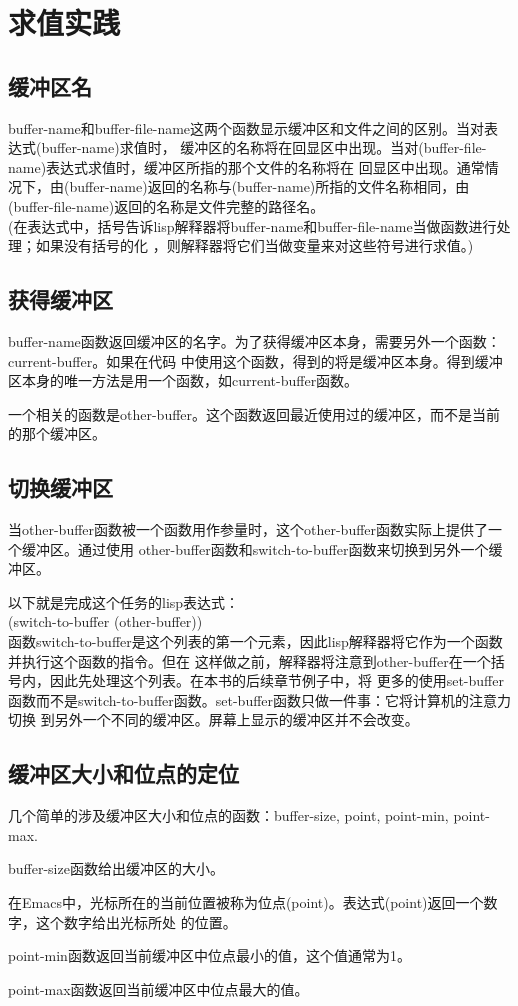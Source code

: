 \chapter{求值实践}
\section{缓冲区名}
buffer-name和buffer-file-name这两个函数显示缓冲区和文件之间的区别。当对表达式(buffer-name)求值时，
缓冲区的名称将在回显区中出现。当对(buffer-file-name)表达式求值时，缓冲区所指的那个文件的名称将在
回显区中出现。通常情况下，由(buffer-name)返回的名称与(buffer-name)所指的文件名称相同，由
(buffer-file-name)返回的名称是文件完整的路径名。\\
(在表达式中，括号告诉lisp解释器将buffer-name和buffer-file-name当做函数进行处理；如果没有括号的化
，则解释器将它们当做变量来对这些符号进行求值。)

\section{获得缓冲区}
buffer-name函数返回缓冲区的名字。为了获得缓冲区本身，需要另外一个函数：current-buffer。如果在代码
中使用这个函数，得到的将是缓冲区本身。得到缓冲区本身的唯一方法是用一个函数，如current-buffer函数。
\par{一个相关的函数是other-buffer。这个函数返回最近使用过的缓冲区，而不是当前的那个缓冲区。}

\section{切换缓冲区}
当other-buffer函数被一个函数用作参量时，这个other-buffer函数实际上提供了一个缓冲区。通过使用
other-buffer函数和switch-to-buffer函数来切换到另外一个缓冲区。
\par{以下就是完成这个任务的lisp表达式：\\
(switch-to-buffer (other-buffer))\\
函数switch-to-buffer是这个列表的第一个元素，因此lisp解释器将它作为一个函数并执行这个函数的指令。但在
这样做之前，解释器将注意到other-buffer在一个括号内，因此先处理这个列表。在本书的后续章节例子中，将
更多的使用set-buffer函数而不是switch-to-buffer函数。set-buffer函数只做一件事：它将计算机的注意力切换
到另外一个不同的缓冲区。屏幕上显示的缓冲区并不会改变。}

\section{缓冲区大小和位点的定位}
几个简单的涉及缓冲区大小和位点的函数：buffer-size, point, point-min, point-max.\\
\par{buffer-size函数给出缓冲区的大小。}
\par{在Emacs中，光标所在的当前位置被称为位点(point)。表达式(point)返回一个数字，这个数字给出光标所处
的位置。}
\par{point-min函数返回当前缓冲区中位点最小的值，这个值通常为1。}
\par{point-max函数返回当前缓冲区中位点最大的值。}

